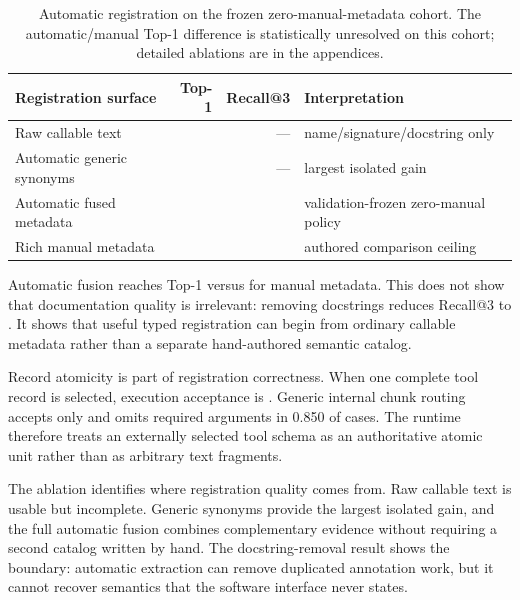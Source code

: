 \documentclass[11pt]{article}
\begin{document}
\begin{table}[t]
\centering
\small
\begin{tabular}{@{}lrrl@{}}
\toprule
Registration surface & Top-1 & Recall@3 & Interpretation \\
\midrule
Raw callable text & \PaperSixFiveAblationRawTopOne{} & --- & name/signature/docstring only \\
Automatic generic synonyms & \PaperSixFiveAblationSynonymTopOne{} & --- & largest isolated gain \\
Automatic fused metadata & \PaperSixFiveAblationAutoTopOne{} & \PaperSixFiveAblationAutoRecallThree{} & validation-frozen zero-manual policy \\
Rich manual metadata & \PaperSixFiveAblationManualTopOne{} & \PaperSixFiveAblationManualRecallThree{} & authored comparison ceiling \\
\bottomrule
\end{tabular}
\caption{Automatic registration on the frozen zero-manual-metadata cohort.
The automatic/manual Top-1 difference is statistically unresolved on this
cohort; detailed ablations are in the appendices.}
\label{tab:automatic-registration}
\end{table}

Automatic fusion reaches \PaperSixFiveAblationAutoTopOne{} Top-1 versus
\PaperSixFiveAblationManualTopOne{} for manual metadata. This does not show
that documentation quality is irrelevant: removing docstrings reduces
Recall@3 to \PaperSixFiveDocstringRemovalRecallThree{}. It shows that useful
typed registration can begin from ordinary callable metadata rather than a
separate hand-authored semantic catalog.

Record atomicity is part of registration correctness. When one complete tool
record is selected, execution acceptance is
\PaperSixFiveAtomicCallValidity{}. Generic internal chunk routing accepts only
\PaperSixFiveGenericChunkValidity{} and omits required arguments in 0.850 of
cases. The runtime therefore treats an externally selected tool schema as an
authoritative atomic unit rather than as arbitrary text fragments.

The ablation identifies where registration quality comes from. Raw callable
text is usable but incomplete. Generic synonyms provide the largest isolated
gain, and the full automatic fusion combines complementary evidence without
requiring a second catalog written by hand. The docstring-removal result shows
the boundary: automatic extraction can remove duplicated annotation work, but
it cannot recover semantics that the software interface never states.
\end{document}
